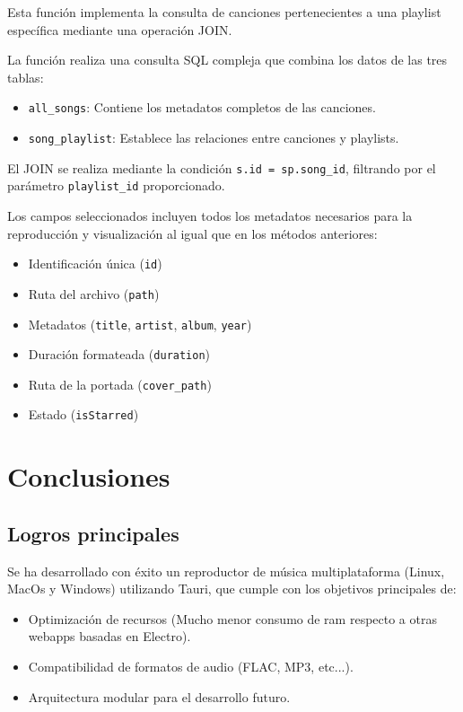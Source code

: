 \documentclass[11pt, a4paper]{article}
\begin{document}
            Esta función implementa la consulta de canciones pertenecientes a una playlist específica mediante una operación JOIN.

            La función realiza una consulta SQL compleja que combina los datos de las tres tablas:

            \begin{itemize}
              \item \verb|all_songs|: Contiene los metadatos completos de las canciones.
              \item \verb|song_playlist|: Establece las relaciones entre canciones y playlists.
            \end{itemize}

            El JOIN se realiza mediante la condición \verb|s.id = sp.song_id|, filtrando por el parámetro \verb|playlist_id| proporcionado.

            Los campos seleccionados incluyen todos los metadatos necesarios para la reproducción y visualización al igual que en los métodos anteriores:
            \begin{itemize}
              \item Identificación única (\verb|id|)
              \item Ruta del archivo (\verb|path|)
              \item Metadatos (\verb|title|, \verb|artist|, \verb|album|, \verb|year|)
              \item Duración formateada (\verb|duration|)
              \item Ruta de la portada (\verb|cover_path|)
              \item Estado (\verb|isStarred|)
            \end{itemize}

\section{Conclusiones}

        \subsection{Logros principales}

        Se ha desarrollado con éxito un reproductor de música multiplataforma (Linux, MacOs y Windows) utilizando Tauri, que cumple con los objetivos principales de:

        \begin{itemize}
            \item Optimización de recursos (Mucho menor consumo de ram respecto a otras webapps basadas en Electro).
            \item Compatibilidad de formatos de audio (FLAC, MP3, etc...).
            \item Arquitectura modular para el desarrollo futuro.
        \end{itemize}
\end{document}

